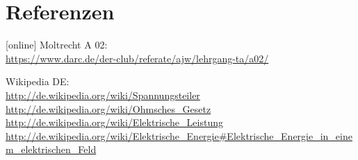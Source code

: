 \section{Referenzen}
\begin{small}
  \begin{thebibliography}{}
      [online]
      Moltrecht A 02: \\
      \url{https://www.darc.de/der-club/referate/ajw/lehrgang-ta/a02/}

        Wikipedia DE: \\
      \url{http://de.wikipedia.org/wiki/Spannungsteiler}\\
      \url{http://de.wikipedia.org/wiki/Ohmsches_Gesetz}\\
      \url{http://de.wikipedia.org/wiki/Elektrische_Leistung}\\
      \url{http://de.wikipedia.org/wiki/Elektrische_Energie#Elektrische_Energie_in_einem_elektrischen_Feld}\\
  \end{thebibliography}
\end{small}


